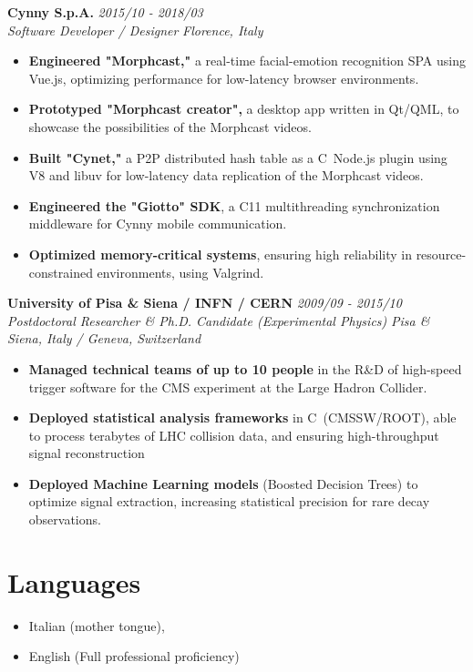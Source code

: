 \documentclass[11pt,a4paper]{article}
\newcommand{\CC}{C\nolinebreak\hspace{-.05em}\raisebox{.4ex}{\tiny\bf +}\nolinebreak\hspace{-.10em}\raisebox{.4ex}{\tiny\bf +}}
\begin{document}
\vspace{10pt}

\noindent\textbf{Cynny S.p.A.} \hfill \textit{2015/10 - 2018/03} \\
\textit{Software Developer / Designer} \hfill \textit{Florence, Italy}
\begin{itemize}[leftmargin=1.5em, itemsep=3pt, topsep=4pt]
  \item \textbf{Engineered "Morphcast,"} a real-time facial-emotion recognition SPA using Vue.js, optimizing performance for low-latency browser environments.
  \item \textbf{Prototyped "Morphcast creator",} a desktop app written in Qt/QML, to showcase the possibilities of the Morphcast videos.
  \item \textbf{Built "Cynet,"} a P2P distributed hash table as a \CC~Node.js plugin using V8 and libuv for low-latency data replication of the Morphcast videos.
  \item \textbf{Engineered the "Giotto" SDK}, a \CC11 multithreading synchronization middleware for Cynny mobile communication.
  \item \textbf{Optimized memory-critical systems}, ensuring high reliability in resource-constrained environments, using Valgrind.
\end{itemize}

\vspace{10pt}

\noindent\textbf{University of Pisa \& Siena / INFN / CERN} \hfill \textit{2009/09 - 2015/10} \\
\textit{Postdoctoral Researcher \& Ph.D. Candidate (Experimental Physics)} \hfill \textit{Pisa \& Siena, Italy / Geneva, Switzerland}
\begin{itemize}[leftmargin=1.5em, itemsep=3pt, topsep=4pt]
  \item \textbf{Managed technical teams of up to 10 people} in the R\&D of high-speed trigger software for the CMS experiment at the Large Hadron Collider.
  \item \textbf{Deployed statistical analysis frameworks} in \CC~(CMSSW/ROOT), able to process terabytes of LHC collision data, and ensuring high-throughput signal reconstruction
  \item \textbf{Deployed Machine Learning models} (Boosted Decision Trees) to optimize signal extraction, increasing statistical precision for rare decay observations.
\end{itemize}

\section{Languages}
\begin{itemize}[leftmargin=1.5em, itemsep=4pt]
  \item Italian (mother tongue),
  \item English (Full professional proficiency)
\end{itemize}
\end{document}
